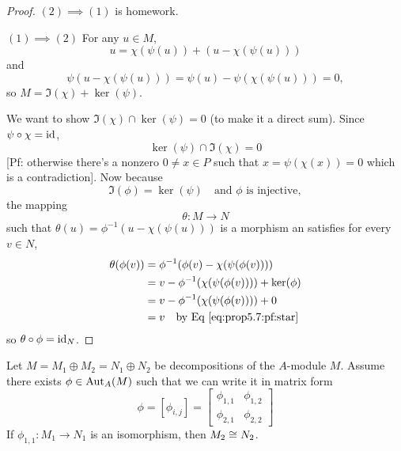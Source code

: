 \begin{proof}
$(2)\implies(1)$ is homework.

$(1)\implies(2)$ For any $u\in M$,
\begin{equation}
u=\chi(\psi(u))+(u-\chi(\psi(u)))
\end{equation}
and
\begin{equation}
\psi(u-\chi(\psi(u)))=\psi(u)-\psi(\chi(\psi(u)))=0,
\end{equation}
so $M=\Im(\chi)+\ker(\psi)$.

We want to show $\Im(\chi)\cap\ker(\psi)=0$ (to make it a direct
sum). Since $\psi\circ\chi=\operatorname{id}$,
\begin{equation}
\ker(\psi)\cap\Im(\chi)=0
\end{equation}
[Pf: otherwise there's a nonzero $0\neq x\in P$ such that $x=\psi(\chi(x))=0$
  which is a contradiction].
Now because
\begin{equation}\label{eq:prop5.7:pf:star}
\Im(\phi)=\ker(\psi)\quad\mbox{and $\phi$ is injective},
\end{equation}
the mapping
\begin{equation}
\theta\colon M\to N
\end{equation}
such that $\theta(u)=\phi^{-1}(u-\chi(\psi(u)))$ is a morphism an
satisfies for every $v\in N$,
\begin{subequations}
  \begin{align}
\theta(\phi(v)) &= \phi^{-1}(\phi(v)-\chi(\psi(\phi(v))))\\
&=v-\phi^{-1}(\chi(\psi(\phi(v))))+\ker(\phi)\\
&=v-\phi^{-1}(\chi(\psi(\phi(v))))+0\\
&=v\quad\mbox{by Eq~\eqref{eq:prop5.7:pf:star}}
  \end{align}
\end{subequations}
so $\theta\circ\phi=\operatorname{id}_{N}$.
\end{proof}

\begin{lemma}\label{lemma:5.8}
Let $M=M_{1}\oplus M_{2}=N_{1}\oplus N_{2}$ be decompositions of the
$A$-module $M$. Assume there exists $\phi\in\operatorname{Aut}_{A}(M)$ such that we
can write it in matrix form
\begin{equation}
\phi=[\phi_{i,j}]=\begin{bmatrix}\phi_{1,1} & \phi_{1,2}\\\phi_{2,1} & \phi_{2,2}
\end{bmatrix}
\end{equation}
If $\phi_{1,1}\colon M_{1}\to N_{1}$ is an isomorphism, then
$M_{2}\cong N_{2}$.
\end{lemma}

